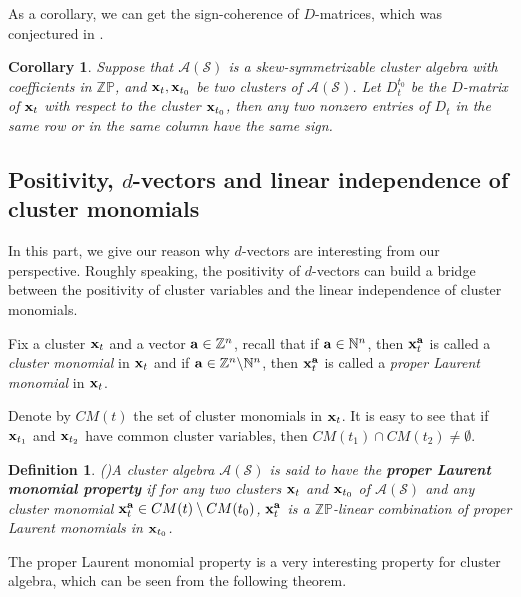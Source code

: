 \documentclass[14pt]{amsart}
\newtheorem{Definition}[Theorem]{Definition}
\newtheorem{Corollary}[Theorem]{Corollary}
\begin{document}
 As a corollary, we can get the sign-coherence of $D$-matrices, which was conjectured in \cite{FZ3}.
\begin{Corollary}
Suppose that $\mathcal A(\mathcal S)$ is a skew-symmetrizable cluster algebra with coefficients in $\mathbb {ZP}$, and ${\bf x}_t,{\bf x}_{t_0}$ be two clusters of $\mathcal A(\mathcal S)$. Let $D_t^{t_0}$ be the $D$-matrix of ${\bf x}_t$ with respect to the cluster ${\bf x}_{t_0}$, then any two nonzero entries of $D_t$ in the same row or in the same column have the same sign.
\end{Corollary}




\subsection{Positivity, $d$-vectors and linear independence of cluster monomials} In this part, we give our reason why $d$-vectors are interesting from our perspective. Roughly speaking, the positivity of $d$-vectors can build a bridge between the positivity of cluster variables and the linear independence of cluster monomials.




Fix a cluster ${\bf x}_t$ and a vector ${\bf a}\in\mathbb Z^n$, recall that if ${\bf a}\in\mathbb N^n$,  then ${\bf x}_t^{\bf a}$ is called a {\em cluster monomial} in ${\bf x}_t$ and if ${\bf a}\in\mathbb Z^n\backslash \mathbb N^n$, then ${\bf x}_t^{\bf a}$ is called a {\em proper Laurent monomial} in ${\bf x}_t$.

 Denote by $CM(t)$  the set of cluster monomials in ${\bf x}_t$. It is easy to see that if ${\bf x}_{t_1}$ and ${\bf x}_{t_2}$ have common cluster variables, then $CM(t_1)\cap CM(t_2)\not=\emptyset$.



\begin{Definition}(\cite{CLF,CKLP})\label{deflaurent}
 A cluster algebra $\mathcal A(\mathcal S)$  is said to have  the {\bf proper Laurent monomial property} if
for any two clusters ${\bf x}_t$ and ${\bf x}_{t_0}$ of $\mathcal A(\mathcal S)$ and any cluster monomial ${\bf x}_t^{\bf a}\in CM(t)\setminus CM(t_0)$, ${\bf x}_{t}^{\bf a}$ is a $\mathbb {ZP}$-linear combination of proper Laurent monomials in ${\bf x}_{t_0}$.
\end{Definition}

The proper Laurent monomial property is a very interesting property for cluster algebra, which can be seen from the following theorem.
\end{document}
